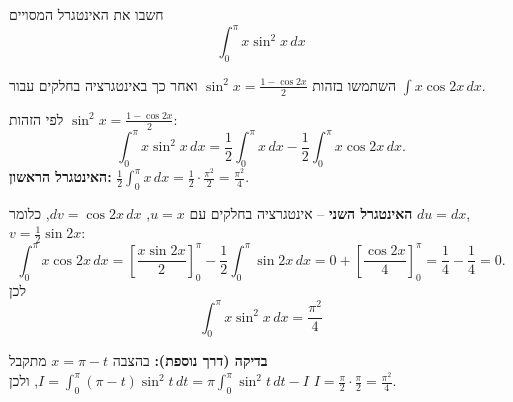 
\begin{question}
חשבו את האינטגרל המסויים
\[ \int_0^{\pi}x\sin^2x\,dx \]
\end{question}

\begin{hint}
השתמשו בזהות $\sin^2x=\frac{1-\cos 2x}{2}$ ואחר כך באינטגרציה בחלקים עבור $\int x\cos2x\,dx$.
\end{hint}

\begin{solution}
לפי הזהות $\sin^2x=\frac{1-\cos2x}{2}$:
\[ \int_0^{\pi}x\sin^2x\,dx=\frac12\int_0^{\pi}x\,dx-\frac12\int_0^{\pi}x\cos2x\,dx. \]
\textbf{האינטגרל הראשון:} $\frac12\int_0^\pi x\,dx=\frac12\cdot\frac{\pi^2}{2}=\frac{\pi^2}{4}$.

\textbf{האינטגרל השני} – אינטגרציה בחלקים עם $u=x$, $dv=\cos2x\,dx$, כלומר $du=dx$, $v=\frac12\sin2x$:
\[ \int_0^{\pi}x\cos2x\,dx=\left[\frac{x\sin2x}{2}\right]_0^{\pi}-\frac12\int_0^{\pi}\sin2x\,dx = 0+\left[\frac{\cos2x}{4}\right]_0^{\pi}=\frac14-\frac14=0. \]
לכן
\[ \boxed{\int_0^{\pi}x\sin^2x\,dx=\frac{\pi^2}{4}} \]

\textbf{בדיקה (דרך נוספת):} בהצבה $x=\pi-t$ מתקבל $I=\int_0^\pi(\pi-t)\sin^2t\,dt=\pi\int_0^\pi\sin^2t\,dt-I$, ולכן $I=\frac\pi2\cdot\frac\pi2=\frac{\pi^2}{4}$.
\end{solution}
